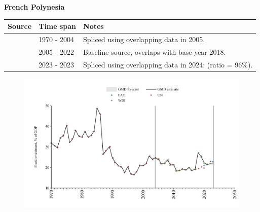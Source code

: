 \documentclass[12pt,a4paper,landscape]{article}
\begin{document}
\begin{adjustbox}{max totalsize={\paperwidth}{\paperheight},center}
\begin{minipage}[t][\textheight][t]{\textwidth}
\vspace*{0.5cm}
{}
\begin{center}
{\Large\bfseries French Polynesia}
\end{center}
\vspace{0.5cm}
\begin{table}[H]
\centering
\small
\begin{tabular}{|l|l|l|}
\hline
\textbf{Source} & \textbf{Time span} & \textbf{Notes} \\
\hline
\rowcolor{white}\cite{UN}& 1970 - 2004 &Spliced using overlapping data in 2005.\\
\rowcolor{lightgray}\cite{WDI}& 2005 - 2022 &Baseline source, overlaps with base year 2018.\\
\rowcolor{white}\cite{FAO}& 2023 - 2023 &Spliced using overlapping data in 2024: (ratio = 96\%).\\
\hline
\end{tabular}
\end{table}
\begin{figure}[H]
\centering
\includegraphics[width=\textwidth,height=0.6\textheight,keepaspectratio]{graphs/PYF_finv_GDP.pdf}
\end{figure}
\end{minipage}
\end{adjustbox}
\end{document}
